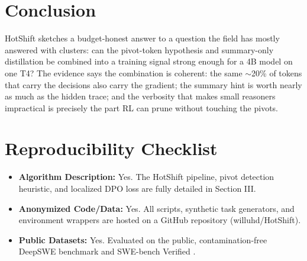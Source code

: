 \documentclass[conference]{IEEEtran}
\begin{document}
\section{Conclusion}
\label{sec:conclusion}
HotShift sketches a budget-honest answer to a question the field has mostly answered with clusters: can the pivot-token hypothesis and summary-only distillation be combined into a training signal strong enough for a 4B model on one T4? The evidence says the combination is coherent: the same $\sim$20\% of tokens that carry the decisions also carry the gradient; the summary hint is worth nearly as much as the hidden trace; and the verbosity that makes small reasoners impractical is precisely the part RL can prune without touching the pivots.

\section*{Reproducibility Checklist}
\label{sec:checklist}
\begin{itemize}
    \item \textbf{Algorithm Description:} Yes. The HotShift pipeline, pivot detection heuristic, and localized DPO loss are fully detailed in Section III.
    \item \textbf{Anonymized Code/Data:} Yes. All scripts, synthetic task generators, and environment wrappers are hosted on a GitHub repository (willuhd/HotShift).
    \item \textbf{Public Datasets:} Yes. Evaluated on the public, contamination-free DeepSWE benchmark \cite{deepswe} and SWE-bench Verified \cite{swebench}.
\end{itemize}
\end{document}
